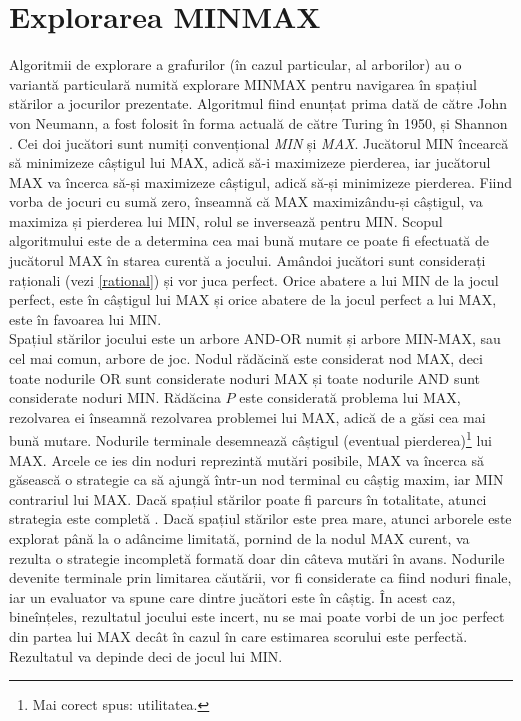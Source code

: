 \documentclass[12pt,twoside,a4paper,fleqn]{book}
\theoremstyle{definition}
\begin{document}
\section{Explorarea MINMAX}
\label{capitol_minmax}
Algoritmii de explorare a grafurilor (în cazul particular, al arborilor) au o variantă particulară numită explorare MINMAX pentru navigarea în spațiul stărilor a jocurilor prezentate. Algoritmul fiind enunțat prima dată de către John von Neumann, a fost folosit în forma actuală de către Turing în 1950, și Shannon \cite{Shannon}. Cei doi jucători sunt numiți convențional \emph{MIN} și \emph{MAX}. Jucătorul MIN încearcă să minimizeze câștigul lui MAX, adică să-i maximizeze pierderea, iar jucătorul MAX va încerca să-și maximizeze câștigul, adică să-și minimizeze pierderea. Fiind vorba de jocuri cu sumă zero, înseamnă că MAX maximizându-și câștigul, va maximiza și pierderea lui MIN, rolul se inversează pentru MIN. Scopul algoritmului este de a determina cea mai bună mutare ce poate fi efectuată de jucătorul MAX în starea curentă a jocului. Amândoi jucători sunt considerați raționali (vezi \ref{rational}) și vor juca perfect. Orice abatere a lui MIN de la jocul perfect, este în câștigul lui MAX și orice abatere de la jocul perfect a lui MAX, este în favoarea lui MIN.\\
Spațiul stărilor jocului este un arbore AND-OR numit și arbore MIN-MAX, sau cel mai comun, arbore de joc. Nodul rădăcină este considerat nod MAX, deci toate nodurile OR sunt considerate noduri MAX și toate nodurile AND sunt considerate noduri MIN. Rădăcina $P$ este considerată problema lui MAX, rezolvarea ei înseamnă rezolvarea problemei lui MAX, adică de a găsi cea mai bună mutare. Nodurile terminale desemnează câștigul (eventual pierderea)\footnote{Mai corect spus: utilitatea.} lui MAX. Arcele ce ies din noduri reprezintă mutări posibile, MAX va încerca să găsească o strategie ca să ajungă într-un nod terminal cu câștig maxim, iar MIN contrariul lui MAX. Dacă spațiul stărilor poate fi parcurs în totalitate, atunci strategia este completă \cite{Giumale}. Dacă spațiul stărilor este prea mare, atunci arborele este explorat până la o adâncime limitată, pornind de la nodul MAX curent, va rezulta o strategie incompletă formată doar din câteva mutări în avans. Nodurile devenite terminale prin limitarea căutării, vor fi considerate ca fiind noduri finale, iar un evaluator va spune care dintre jucători este în câștig. În acest caz, bineînțeles, rezultatul jocului este incert, nu se mai poate vorbi de un joc perfect din partea lui MAX decât în cazul în care estimarea scorului este perfectă. Rezultatul va depinde deci de jocul lui MIN.
\end{document}
